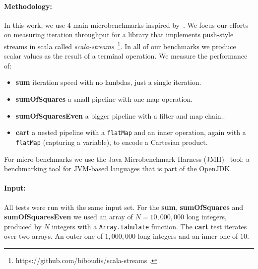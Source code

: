 






\paragraph{Methodology: } In this work, we use 4 main microbenchmarks inspired
by~\cite{biboudis_clash_2014}. We focus our efforts on measuring iteration
throughput for a library that implements push-style streams in scala called
\emph{scala-streams}~\footnote{https://github.com/biboudis/scala-streams .}. In
all of our benchmarks we produce scalar values as the result of a terminal
operation. We measure the performance of:

\begin{itemize}
 \item \textbf{sum} iteration speed with no lambdas, just a single iteration.
 \item \textbf{sumOfSquares} a small pipeline with one map operation.
 \item \textbf{sumOfSquaresEven} a bigger pipeline with a filter and map chain..
 \item \textbf{cart} a nested pipeline with a \verb|flatMap| and an inner
   operation, again with a \verb|flatMap| (capturing a variable), to encode a
   Cartesian product.
\end{itemize}

For micro-benchmarks we use the Java Microbenchmark Harness
(JMH)~\cite{aleksey_shipilev_openjdk:_????} tool: a benchmarking tool for
JVM-based languages that is part of the OpenJDK.

\paragraph{Input:} All tests were run with the same input set. For the
\textbf{sum}, \textbf{sumOfSquares} and \textbf{sumOfSquaresEven} we used an
array of $N = 10,000,000$ long integers, produced by $N$ integers with a
\verb|Array.tabulate| function. The \textbf{cart} test iterates over two
arrays. An outer one of $1,000,000$ long integers and an inner one of $10$.

